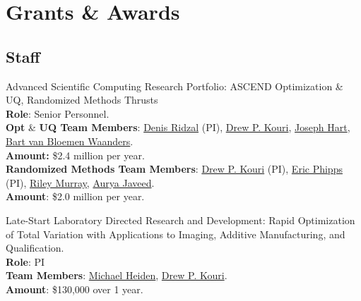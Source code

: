 \documentclass[12pt, a4paper]{article}
\newcommand{\years}[1]{\marginnote{#1}}
\begin{document}
\section*{Grants \& Awards}
\subsection*{Staff}
\years{2024} Advanced Scientific Computing Research Portfolio: ASCEND Optimization \& UQ, Randomized Methods Thrusts \\
\textbf{Role}: Senior Personnel.\\
\textbf{Opt} \& \textbf{UQ Team Members}:
\href{https://cfwebprod.sandia.gov/cfdocs/CompResearch/templates/insert/profile.cfm?dridzal}{Denis Ridzal} (PI),
\href{https://cfwebprod.sandia.gov/cfdocs/CompResearch/templates/insert/profile.cfm?dpkouri}{Drew P. Kouri},
\href{https://www.sandia.gov/ccr/staff/joseph-lee-hart/}{Joseph Hart},
\href{https://www.sandia.gov/ccr/staff/bart-g-van-bloemen-waanders/}{Bart van Bloemen Waanders}. \\
\textbf{Amount:} \$2.4 million per year.\\
\textbf{Randomized Methods Team Members}:
\href{https://cfwebprod.sandia.gov/cfdocs/CompResearch/templates/insert/profile.cfm?dpkouri}{Drew P. Kouri} (PI),
\href{https://www.sandia.gov/ccr/staff/eric-t-phipps/}{Eric Phipps} (PI),
\href{https://rileyjmurray.wordpress.com/}{Riley Murray},
\href{https://rol.sandia.gov/team/}{Aurya Javeed}. \\
\textbf{Amount}: \$2.0 million per year.


\years{2024} Late-Start Laboratory Directed Research and Development: Rapid Optimization of Total Variation with Applications to Imaging, Additive Manufacturing, and Qualification. \\
\textbf{Role}: PI \\
\textbf{Team Members}: \href{https://www.sandia.gov/research/publications/search/?sort=date&format=citation&authors%5B0%5D=michael-heiden}{Michael Heiden}, \href{https://cfwebprod.sandia.gov/cfdocs/CompResearch/templates/insert/profile.cfm?dpkouri}{Drew P. Kouri}.\\
\textbf{Amount}: \$130,000 over 1 year.
\end{document}
